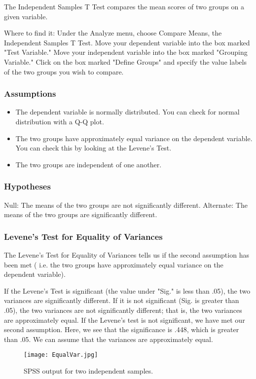 The Independent Samples T Test compares the mean scores of two groups on a given variable.

Where to find it: Under the Analyze menu, choose Compare Means, the Independent Samples T Test. Move your dependent variable into the box marked "Test Variable." Move your independent variable into the box marked "Grouping Variable." Click on the box marked "Define Groups" and specify the value labels of the two groups you wish to compare.

\subsubsection{Assumptions}
\begin{itemize}
\item The dependent variable is normally distributed. You can check for normal distribution with a Q-Q plot.
\item The two groups have approximately equal variance on the dependent variable. You can check this by looking at the Levene's Test.
\item The two groups are independent of one another.
\end{itemize}

\subsubsection{Hypotheses}
Null: The means of the two groups are not significantly different.
Alternate: The means of the two groups are significantly different.

\subsubsection{Levene's Test for Equality of Variances}
The Levene's Test for Equality of Variances  tells us if the second assumption has been met ( i.e. the two groups have approximately equal variance on the dependent variable).

If the Levene's Test is significant (the value under "Sig." is less than .05), the two variances are significantly different. If it is not significant (Sig. is greater than .05), the two variances are not significantly different; that is, the two variances are approximately equal. If the Levene's test is not significant, we have met our second assumption. Here, we see that the significance is .448, which is greater than .05. We can assume that the variances are approximately equal.


\begin{figure}[h!]
\begin{center}
  \texttt{[image: EqualVar.jpg]}
  \caption{SPSS output for two independent samples.}\label{EqualVar}
\end{center}
\end{figure}


